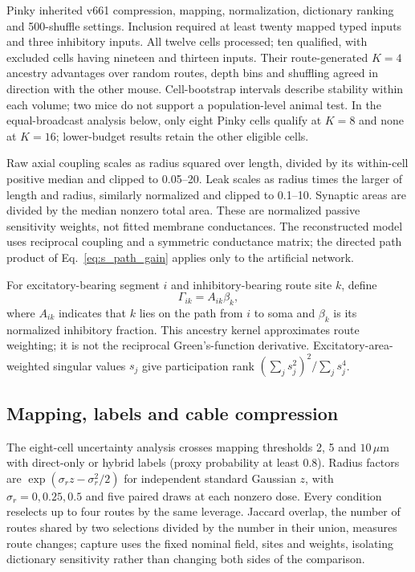 Pinky inherited v661 compression, mapping, normalization, dictionary ranking and 500-shuffle settings. Inclusion required at least twenty mapped typed inputs and three inhibitory inputs. All twelve cells processed; ten qualified, with excluded cells having nineteen and thirteen inputs. Their route-generated $K=4$ ancestry advantages over random routes, depth bins and shuffling agreed in direction with the other mouse. Cell-bootstrap intervals describe stability within each volume; two mice do not support a population-level animal test. In the equal-broadcast analysis below, only eight Pinky cells qualify at $K=8$ and none at $K=16$; lower-budget results retain the other eligible cells.

Raw axial coupling scales as radius squared over length, divided by its within-cell positive median and clipped to 0.05--20. Leak scales as radius times the larger of length and radius, similarly normalized and clipped to 0.1--10. Synaptic areas are divided by the median nonzero total area. These are normalized passive sensitivity weights, not fitted membrane conductances. The reconstructed model uses reciprocal coupling and a symmetric conductance matrix; the directed path product of Eq.~\ref{eq:s_path_gain} applies only to the artificial network.

For excitatory-bearing segment $i$ and inhibitory-bearing route site $k$, define
\begin{equation}
 \Gamma_{ik}=A_{ik}\beta_k,
 \label{eq:s_kernel}
\end{equation}
where $A_{ik}$ indicates that $k$ lies on the path from $i$ to soma and $\beta_k$ is its normalized inhibitory fraction. This ancestry kernel approximates route weighting; it is not the reciprocal Green's-function derivative. Excitatory-area-weighted singular values $s_j$ give participation rank $(\sum_js_j^2)^2/\sum_js_j^4$.

\subsection{Mapping, labels and cable compression}
\label{note:morphology_uncertainty}
The eight-cell uncertainty analysis crosses mapping thresholds 2, 5 and $10\,\mu$m with direct-only or hybrid labels (proxy probability at least 0.8). Radius factors are $\exp(\sigma_r z-\sigma_r^2/2)$ for independent standard Gaussian $z$, with $\sigma_r=0,0.25,0.5$ and five paired draws at each nonzero dose. Every condition reselects up to four routes by the same leverage. Jaccard overlap, the number of routes shared by two selections divided by the number in their union, measures route changes; capture uses the fixed nominal field, sites and weights, isolating dictionary sensitivity rather than changing both sides of the comparison.

